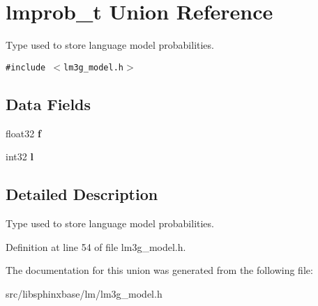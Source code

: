 \section{lmprob\_\-t Union Reference}
\label{unionlmprob__t}
Type used to store language model probabilities.  


{\tt \#include $<$lm3g\_\-model.h$>$}

\subsection*{Data Fields}
\begin{CompactItemize}
\item 
float32 \textbf{f}\label{unionlmprob__t_464d8d65be6af6899dcf63247e6f2b04}

\item 
int32 \textbf{l}\label{unionlmprob__t_c48a650d5ef403456974654eaec688ca}

\end{CompactItemize}


\subsection{Detailed Description}
Type used to store language model probabilities. 

Definition at line 54 of file lm3g\_\-model.h.

The documentation for this union was generated from the following file:\begin{CompactItemize}
\item 
src/libsphinxbase/lm/lm3g\_\-model.h\end{CompactItemize}
